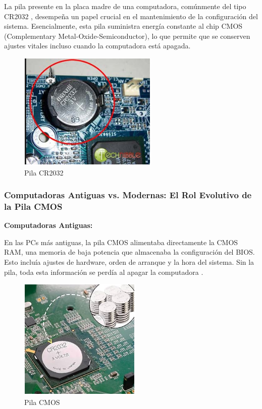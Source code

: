 La pila presente en la placa madre de una computadora, comúnmente del tipo CR2032 \cite{profesionalpila}, desempeña un papel crucial en el mantenimiento de la configuración del sistema. Esencialmente, esta pila suministra energía constante al chip CMOS (Complementary Metal-Oxide-Semiconductor), lo que permite que se conserven ajustes vitales incluso cuando la computadora está apagada.

\begin{figure}[H]
  \centering
  \includegraphics[scale=0.9]{imagenes/pila-cr2032.png}
  \caption{Pila CR2032}
\end{figure}

\subsubsection{Computadoras Antiguas vs. Modernas: El Rol Evolutivo de la Pila CMOS}

\textbf{Computadoras Antiguas:}

En las PCs más antiguas, la pila CMOS alimentaba directamente la CMOS RAM, una memoria de baja potencia que almacenaba la configuración del BIOS. Esto incluía ajustes de hardware, orden de arranque y la hora del sistema. Sin la pila, toda esta información se perdía al apagar la computadora \cite{profesionalpila}.

\begin{figure}[H]
  \centering
  \includegraphics[scale=0.9]{imagenes/pila-cmos.png}
  \caption{Pila CMOS}
\end{figure}

